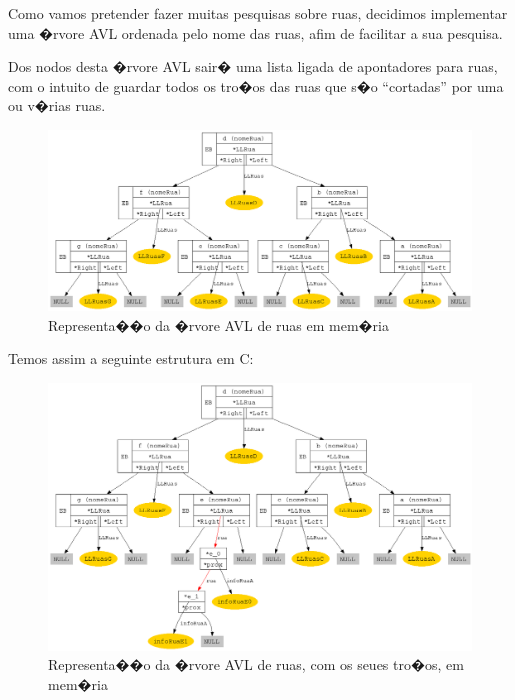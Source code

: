 \documentclass[11pt,a4paper]{article}
\newenvironment{mtc}{\secttoc\sectlof}{\pagebreak}
\begin{document}
\begin{mtc}
Como vamos pretender fazer muitas pesquisas sobre ruas, decidimos implementar uma �rvore \textsf{AVL} ordenada pelo nome das ruas,
afim de facilitar a sua pesquisa.

Dos nodos desta �rvore \textsf{AVL} sair� uma lista ligada de apontadores para ruas, com o intuito de guardar todos os tro�os
das ruas que s�o ``cortadas'' por uma ou v�rias ruas.

\begin{figure}[!ht]\label{avl_ruas}
    \centering
        \includegraphics[width=1\textwidth]{stuff/avl_ruas.png}
    \caption{Representa��o da �rvore \textsf{AVL} de ruas em mem�ria}
\end{figure}

Temos assim a seguinte estrutura em \textsf{C}:
\lstset{language=C_ulisses}


\begin{figure}[!ht]\label{avl_ruas_full}
    \centering
        \includegraphics[width=1\textwidth]{stuff/avl_ruas_full.png}
    \caption{Representa��o da �rvore \textsf{AVL} de ruas, com os seues tro�os, em mem�ria}
\end{figure}


\end{mtc}
\end{document}
